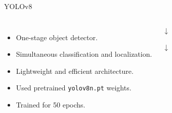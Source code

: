 \documentclass{beamer}
\begin{document}
	\begin{frame}{YOLOv8}
		
		\begin{columns}
			
			
			\begin{itemize}
				\item One-stage object detector.
				\item Simultaneous classification and localization.
				\item Lightweight and efficient architecture.
				\item Used pretrained \texttt{yolov8n.pt} weights.
				\item Trained for 50 epochs.
			\end{itemize}
			
			
			\begin{center}
				
				\vspace{0.2cm}
				
				$\downarrow$
				
				\vspace{0.2cm}
				
				
				\vspace{0.2cm}
				
				$\downarrow$
				
				\vspace{0.2cm}
				
			\end{center}
			
		\end{columns}
		
	\end{frame}
	
\end{document}
